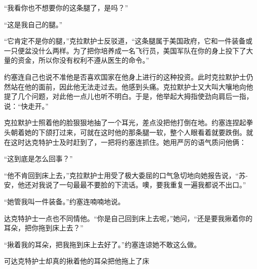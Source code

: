     “我看你也不想要你的这条腿了，是吗？”

    “这是我自己的腿。”

    “它肯定不是你的腿，”克拉默护士反驳道，“这条腿属于美国政府，它和一件装备或一只便盆没什么两样。为了把你培养成一名飞行员，美国军队在你的身上投下了大量的资金，所以你没有权利不遵从医生的命令。”

    约塞连自己也说不准他是否喜欢国家在他身上进行的这种投资。此时克拉默护士仍然站在他的面前，因此他无法走过去。他感到头痛。克拉默护士又大叫大嚷地向他提了几个问题，对此他一点儿也听不明白。于是，他举起大拇指使劲向肩后一指，说：“快走开。”

    克拉默护士照着他的脸狠狠地抽了一个耳光，差点没把他打倒在地。约塞连捏起拳头朝着她的下颌打过来，可就在这时他的那条腿一软，整个人眼看着就要跌倒。就在这时达克特护士及时赶到了，一把将约塞连抓住。她用严厉的语气质问他俩：

    “这到底是怎么回事？”

    “他不肯回到床上去，”克拉默护士用受了极大委屈的口气急切地向她报告说，“苏-安，他还对我说了一句最最不要脸的下流话。噢，要我重复一遍我都说不出口。”

    “她管我叫一件装备。”约塞连喃喃地说。

    达克特护士一点也不同情他。“你是自己回到床上去呢，”她问，“还是要我揪着你的耳朵，把你拖到床上去？”

    “揪着我的耳朵，把我拖到床上去好了。”约塞连谅她不敢这么做。

    可达克特护士却真的揪着他的耳朵把他拖上了床
